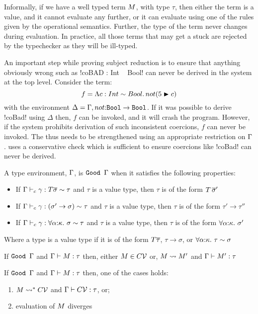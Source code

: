 \documentclass[screen,nonacm,manuscript,review]{acmart} %
\begin{document}
Informally, if we have a well typed term $M$, with type $\tau$, then
either the term is a value, and it cannot evaluate any further, or
it can evaluate using one of the rules given by the operational semantics.
Further, the type of the term never changes during evaluation.
In practice, all those terms that may get a stuck
are rejected by the typechecker as they will be ill-typed.

An important step while proving subject reduction is to ensure
that anything obviously wrong such as
!coBAD : Int ~ Bool! can never be derived in the
system at the top level. Consider the term:
\[ f = \Lambda c:Int \sim Bool.\, not (5\mathrel{\blacktriangleright}c)\]
with the environment $\Delta = \Gamma, not{:}\texttt{Bool} \to \texttt{Bool}$.
If it was possible to derive !coBad! using $\Delta$
then, $f$ can be invoked, and it will
crash the program. However, if the system prohibits derivation
of such inconsistent coercions, $f$ can never be invoked.
The  thus needs to be strengthened
using an appropriate restriction on $\Gamma$.
\SFC uses a conservative check which is sufficient to
ensure coercions like !coBad! can never be derived.

\begin{definition}[$\Good\TEnv$]
 A type environment, $\Gamma$, is $\Good\TEnv$ when it satisfies
 the following properties:
 \begin{itemize}
 \item If $\Gamma \vdash_{c} \gamma : T \overline{\sigma} \sim \tau$ and $\tau$
   is a value type, then $\tau$ is of the form $T\,\overline{\sigma}'$
 \item If $\Gamma \vdash_{c} \gamma : (\sigma' \to \sigma) \sim \tau$ and
   $\tau$ is a value type, then $\tau$ is of the form $\tau' \to \tau''$
 \item If $\Gamma \vdash_{c} \gamma : \forall\alpha{:}\kappa.~\sigma \sim
     \tau$ and $\tau$ is a value type, then $\tau$ is of the form
   $\forall\alpha{:}\kappa.~\sigma'$
 \end{itemize}
 Where a type is a value type if it is of the form $T\overline{\tau}$,
 $\tau\to\sigma$, or $\forall\alpha{:}\kappa.~\tau\sim\sigma$
\end{definition}

\begin{theorem}\label{thm:progress-sfc}
 If $\Good \TEnv$ and $\Gamma \vdash M : \tau$ then, either $M \in
 C\mathcal{V}$ or, $M \rightsquigarrow M'$ and $\Gamma \vdash M' : \tau$
\end{theorem}
\begin{corollary}
\label{thm:soundness-sfc}
 If $\Good \TEnv$ and $\Gamma \vdash M : \tau$ then, one of the cases holds:
 \begin{enumerate}
    \item $M \rightsquigarrow^* C\mathcal{V}$ and $\Gamma \vdash C\mathcal{V} : \tau$, or;
    \item evaluation of $M$ diverges
 \end{enumerate}
\end{corollary}
\end{document}
